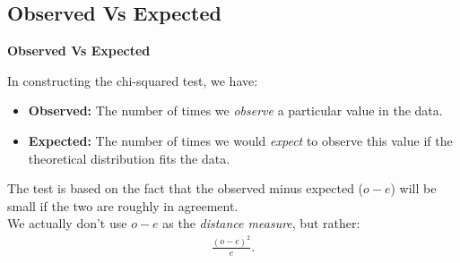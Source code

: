 \documentclass[compress]{beamer}        %
\makeatletter
\newcommand{\tcb}{\textcolor{beamer@blendedblue}}
\makeatother
\begin{document}
\subsection{Observed Vs Expected}
\begin{frame}{\bf \tcb{Observed Vs Expected}}

In constructing the chi-squared test, we have:\\[0.3cm]
\begin{itemize}\itemsep0.8cm
\item {\bf Observed:} The number of times we \emph{observe} a particular value in the data.
\item {\bf Expected:} The number of times we would \emph{expect} to observe this value if the theoretical distribution fits the data.\\[0.8cm]
\end{itemize}

The test is based on the fact that the observed minus expected ($o-e$) will be small if the two are roughly in agreement.\\[0.4cm]

We actually don't use $o-e$ as the \emph{distance measure}, but rather:
\begin{align*}
\frac{(o-e)^2}{e}.
\end{align*}


\end{frame}
\end{document}
